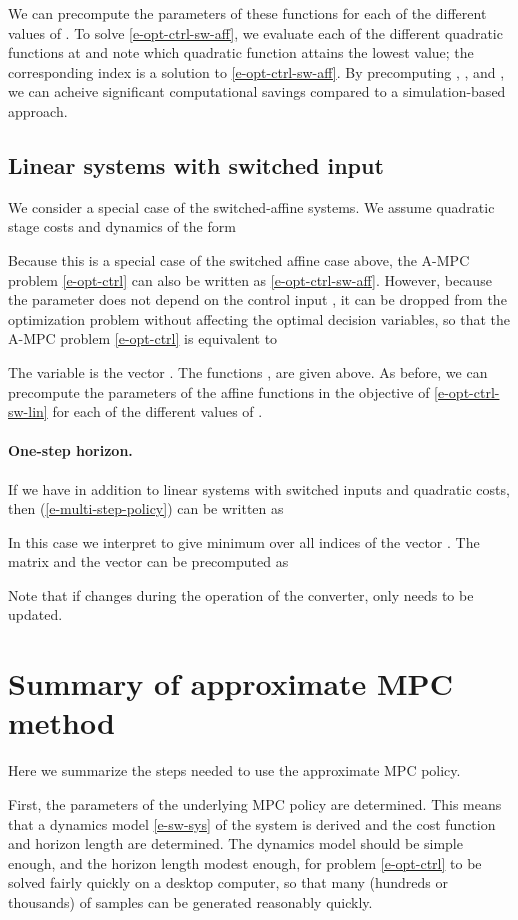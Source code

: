 \documentclass[12pt]{article}
\begin{document}
We can precompute the parameters of these functions
for each of the  different values of .
To solve \eqref{e-opt-ctrl-sw-aff},
we evaluate each of the  different quadratic functions at 
and note which quadratic function attains the lowest value;
the corresponding index  is a solution to 
\eqref{e-opt-ctrl-sw-aff}.
By precomputing , , and ,
we can acheive significant computational savings
compared to a simulation-based approach.


\subsection{Linear systems with switched input}
We consider a special case of the switched-affine systems.
We assume quadratic stage costs and dynamics of the form

Because this is a special case of the switched affine case above,
the A-MPC problem \eqref{e-opt-ctrl}
can also be written as \eqref{e-opt-ctrl-sw-aff}.
However, because the parameter  does not depend on the control input ,
it can be dropped from the optimization problem 
without affecting the optimal decision variables,
so that the A-MPC problem \eqref{e-opt-ctrl} is equivalent to

The variable is the vector 
.
The functions ,  are given above.
As before, we can precompute the parameters of the affine functions
in the objective of \eqref{e-opt-ctrl-sw-lin}
for each of the  different values of .



\paragraph{One-step horizon.} 
If we have  in addition to 
linear systems with switched inputs and quadratic costs,
then (\ref{e-multi-step-policy}) can be written as

In this case we interpret  
to give minimum over all indices of the vector .
The matrix  and 
the vector  can be precomputed as

Note that if  changes during the operation of the converter,
only  needs to be updated.

\section{Summary of approximate MPC method}
Here we summarize the steps needed to use the approximate MPC policy.

First, the parameters of the underlying MPC policy are determined.
This means that a dynamics model \eqref{e-sw-sys}
of the system is derived and
the cost function and horizon length are determined.
The dynamics model should be simple enough, and the horizon length modest enough,
for problem \eqref{e-opt-ctrl}
to be solved fairly quickly on a desktop computer,
so that many (hundreds or thousands) of samples can be generated reasonably quickly.
\end{document}
